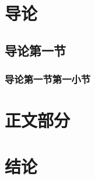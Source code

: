 \documentclass[a4paper]{SWUThesis}
\begin{document}
\maketitle
\makecontents
\makeabstract
\section{导论}
\subsection{导论第一节}
\subsubsection{导论第一节第一小节}
\section{正文部分}
\section{结论}
\makeappendix
\end{document}
